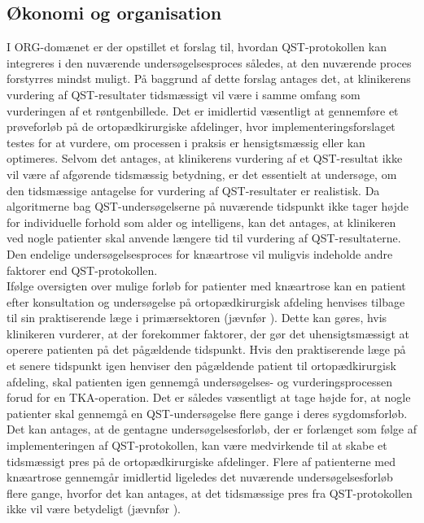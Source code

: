 \subsection{Økonomi og organisation} \label {ECO_ORG} %
I ORG-domænet er der opstillet et forslag til, hvordan QST-protokollen kan integreres i den nuværende undersøgelsesproces således, at den nuværende proces forstyrres mindst muligt. På baggrund af dette forslag antages det, at klinikerens vurdering af QST-resultater tidsmæssigt vil være i samme omfang som vurderingen af et røntgenbillede. Det er imidlertid væsentligt at gennemføre et prøveforløb på de ortopædkirurgiske afdelinger, hvor implementeringsforslaget testes for at vurdere, om processen i praksis er hensigtsmæssig eller kan optimeres. Selvom det antages, at klinikerens vurdering af et QST-resultat ikke vil være af afgørende tidsmæssig betydning, er det essentielt at undersøge, om den tidsmæssige antagelse for vurdering af QST-resultater er realistisk. Da algoritmerne bag QST-undersøgelserne på nuværende tidspunkt ikke tager højde for individuelle forhold som alder og intelligens, kan det antages, at klinikeren ved nogle patienter skal anvende længere tid til vurdering af QST-resultaterne. Den endelige undersøgelsesproces for knæartrose vil muligvis indeholde andre faktorer end QST-protokollen.\\ 
Ifølge oversigten over mulige forløb for patienter med knæartrose kan en patient efter konsultation og undersøgelse på ortopædkirurgisk afdeling henvises tilbage til sin praktiserende læge i primærsektoren (jævnfør ). Dette kan gøres, hvis klinikeren vurderer, at der forekommer faktorer, der gør det uhensigtsmæssigt at operere patienten på det pågældende tidspunkt. Hvis den praktiserende læge på et senere tidspunkt igen henviser den pågældende patient til ortopædkirurgisk afdeling, skal patienten igen gennemgå undersøgelses- og vurderingsprocessen forud for en TKA-operation. Det er således væsentligt at tage højde for, at nogle patienter skal gennemgå en QST-undersøgelse flere gange i deres sygdomsforløb. Det kan antages, at de gentagne undersøgelsesforløb, der er forlænget som følge af implementeringen af QST-protokollen, kan være medvirkende til at skabe et tidsmæssigt pres på de ortopædkirurgiske afdelinger. Flere af patienterne med knæartrose gennemgår imidlertid ligeledes det nuværende undersøgelsesforløb flere gange, hvorfor det kan antages, at det tidsmæssige pres fra QST-protokollen ikke vil være betydeligt (jævnfør ).

